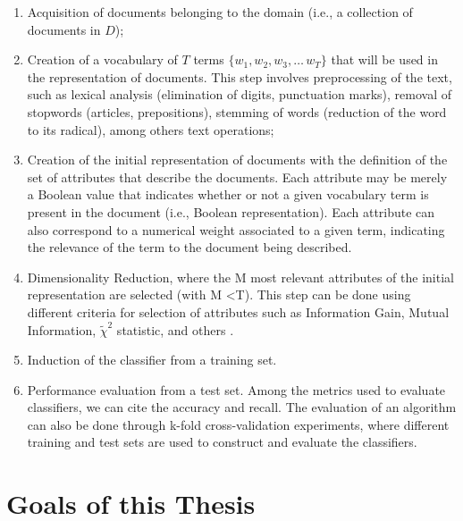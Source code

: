 \begin{enumerate}
\item  Acquisition of documents belonging to the domain (i.e.,
a collection of documents in $D$);
\item Creation of a vocabulary of $T$ terms  $\{w_1,w_2,w_3,\ldots\,w_T\}$ that will be used in the representation of documents. This step involves preprocessing of the text, such as lexical analysis (elimination of digits, punctuation marks), removal of stopwords (articles, prepositions), stemming of words (reduction of the word to its radical), among others text operations;

\item Creation of the initial representation of documents with the definition of the set of attributes that describe the documents. Each attribute may be merely a Boolean value that indicates whether or not a given vocabulary term is present in the document (i.e., Boolean representation).  Each attribute can also correspond to a numerical weight associated to a given term, indicating the relevance of the term to the document being described. 

\item Dimensionality Reduction, where the M most relevant attributes of the initial representation are selected (with M <T). This step can be done using different criteria for selection of attributes such as Information Gain, Mutual Information, $\tilde{\chi}^2$ statistic, and others \cite{Yang:1997}.

\item Induction of the classifier from a training set. %

\item Performance evaluation from a test set. Among the metrics used to evaluate classifiers, we can cite the accuracy and recall. The evaluation of an algorithm can also be done through k-fold cross-validation experiments, where different training and test sets are used to construct and evaluate the classifiers. %

\end{enumerate}


\section{\hspace*{3pt}Goals of this Thesis}

